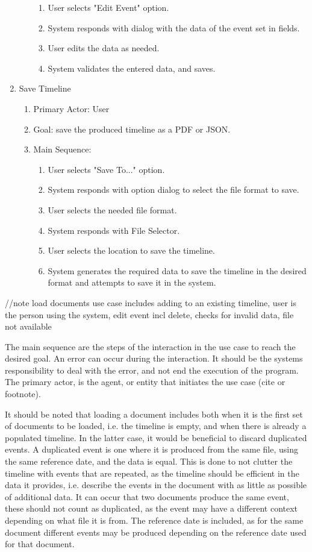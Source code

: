 \begin{enumerate}
\begin{enumerate}
\begin{enumerate}
		\item User selects "Edit Event" option.
		\item System responds with dialog with the data of the event set in fields.
		\item User edits the data as needed.
		\item System validates the entered data, and saves.
	\end{enumerate}
     \end{enumerate}
   \item Save Timeline
    \begin{enumerate}
	\item Primary Actor: User
	\item Goal: save the produced timeline as a PDF or JSON.
	\item Main Sequence:
	\begin{enumerate}
		\item User selects "Save To..." option.
		\item System responds with option dialog to select the file format to save.
		\item User selects the needed file format.
		\item System responds with File Selector.
		\item User selects the location to save the timeline.
		\item System generates the required data to save the timeline in the desired format and attempts to save it in the system.
	\end{enumerate}
    \end{enumerate}
\end{enumerate}
//note load documents use case includes adding to an existing timeline, user is the person using the system, edit event incl delete, checks for invalid data, file not available
\par The main sequence are the steps of the interaction in the use case to reach the desired goal. An error can occur during the interaction. It should be the systems responsibility to deal with the error, and not end the execution of the program. The primary actor, is the agent, or entity that initiates the use case (cite or footnote).
\par It should be noted that loading a document includes both when it is the first set of documents to be loaded, i.e. the timeline is empty, and when there is already a populated timeline. In the latter case, it would be beneficial to discard duplicated events. A duplicated event is one where it is produced from the same file, using the same reference date, and the data is equal. This is done to not clutter the timeline with events that are repeated, as the timeline should be efficient in the data it provides, i.e. describe the events in the document with as little as possible of additional data. It can occur that two documents produce the same event, these should not count as duplicated, as the event may have a different context depending on what file it is from. The reference date is included, as for the same document different events may be produced depending on the reference date used for that document. 
